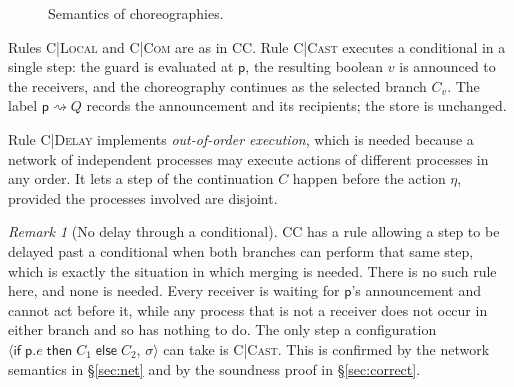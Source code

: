 \documentclass[11pt]{article}
\makeatletter
\theoremstyle{plain}
\theoremstyle{definition}
\theoremstyle{remark}
\newtheorem{remark}[theorem]{Remark}
\newcommand{\kw}[1]{\mathsf{#1}}
\newcommand{\kif}{\kw{if}\;}
\newcommand{\kthen}{\;\kw{then}\;}
\newcommand{\kelse}{\;\kw{else}\;}
\newcommand{\seq}{;\;}
\newcommand{\pp}{\mathsf{p}}
\newcommand{\qq}{\mathsf{q}}
\newcommand{\pn}{\mathrm{pn}}
\newcommand{\eval}[3]{#1 \downarrow_{#2} #3}
\newcommand{\conf}[2]{\langle #1,\, #2\rangle}
\newcommand{\lto}[1]{\xrightarrow{\;#1\;}}
\newcommand{\tauat}[1]{\tau\mathord{@}#1}
\newcommand{\cast}[2]{#1 \rightsquigarrow #2}
\newcommand{\upd}[3]{#1[#2 \mapsto #3]}
\newcommand{\rn}[1]{{\normalfont\scshape #1}}
\newcommand{\ifcond}[3]{\kif #1 \kthen #2 \kelse #3}
\makeatother
\begin{document}
\begin{figure}[t]
\caption{Semantics of choreographies.}
\label{fig:chor-sem}
\end{figure}

Rules \rn{C|Local} and \rn{C|Com} are as in CC.  Rule \rn{C|Cast} executes a
conditional in a single step: the guard is evaluated at $\pp$, the resulting
boolean $v$ is announced to the receivers, and the choreography continues as
the selected branch $C_v$.  The label $\cast{\pp}{Q}$ records the announcement
and its recipients; the store is unchanged.

Rule \rn{C|Delay} implements \emph{out-of-order execution}, which is needed
because a network of independent processes may execute actions of different
processes in any order.  It lets a step of the continuation $C$ happen before
the action $\eta$, provided the processes involved are disjoint.

\begin{remark}[No delay through a conditional]\label{rem:no-delay-cond}
  CC has a rule allowing a step to be delayed past a conditional when both
  branches can perform that same step, which is exactly the situation in
  which merging is needed.  There is no such rule here, and none is needed.
  Every receiver is waiting for $\pp$'s announcement and cannot act before
  it, while any process that is not a receiver does not occur in either branch
  and so has nothing to do.  The only step a configuration
  $\conf{\ifcond{\pp.e}{C_1}{C_2}}{\sigma}$ can take is \rn{C|Cast}.  This is
  confirmed by the network semantics in \S\ref{sec:net} and by the soundness
  proof in \S\ref{sec:correct}.
\end{remark}
\end{document}
